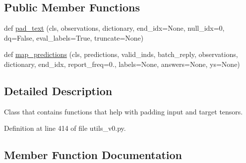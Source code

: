 \subsection*{Public Member Functions}
\begin{DoxyCompactItemize}
\item 
def \hyperlink{classparlai_1_1agents_1_1legacy__agents_1_1seq2seq_1_1utils__v0_1_1PaddingUtils_ae7f9ca3d9fd7dd823895a28af6cae34f}{pad\+\_\+text} (cls, observations, dictionary, end\+\_\+idx=None, null\+\_\+idx=0, dq=False, eval\+\_\+labels=True, truncate=None)
\item 
def \hyperlink{classparlai_1_1agents_1_1legacy__agents_1_1seq2seq_1_1utils__v0_1_1PaddingUtils_ae2c46f2f424e4301873e1c5bc201646c}{map\+\_\+predictions} (cls, predictions, valid\+\_\+inds, batch\+\_\+reply, observations, dictionary, end\+\_\+idx, report\+\_\+freq=0., labels=None, answers=None, ys=None)
\end{DoxyCompactItemize}


\subsection{Detailed Description}
\begin{DoxyVerb}Class that contains functions that help with padding input and target tensors.
\end{DoxyVerb}
 

Definition at line 414 of file utils\+\_\+v0.\+py.



\subsection{Member Function Documentation}
\mbox{\label{classparlai_1_1agents_1_1legacy__agents_1_1seq2seq_1_1utils__v0_1_1PaddingUtils_ae2c46f2f424e4301873e1c5bc201646c}} 
